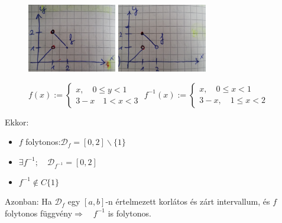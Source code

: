 \documentclass[a4paper,11.5pt]{article}
\begin{document}
	\begin{example}\
		
		\begin{figure}[H]
			\centering
			\includegraphics[height=3cm]{kepek/inverse_function_example_1.jpg}\quad \quad \quad 
			\includegraphics[height=3cm]{kepek/inverse_function_example_2.jpg}
			
			\medskip
			$f(x):=\left\{\begin{gathered}
			x,\quad 0\leq y<1\\
			3-x\quad 1<x<3
			\end{gathered}\right.$
			\quad \quad \quad $f^{-1}(x):=\left\{\begin{gathered}
			x,\quad 0\leq x<1\\
			3-x,\quad 1\leq x<2
			\end{gathered}\right. $
			\caption{}\label{fig_folytonossag_nem_oroklodik}
		\end{figure}
		
		Ekkor:
		\begin{itemize}[$\bullet$]
			\item $f$ folytonos:\quad $\mathcal{D}_f=[0,2]\backslash\{1\}$
			\item $\exists f^{-1};\quad \mathcal{D}_{f^{-1}}=[0,2]$
			\item $f^{-1}\notin C\{1\}$
		\end{itemize}
		Azonban: \quad Ha $\mathcal{D}_f$ egy $[a,b]$-n értelmezett korlátos és zárt intervallum, és $f$ folytonos függvény\quad $\Rightarrow\quad f^{-1}$ is folytonos.
	\end{example}
\end{document}
